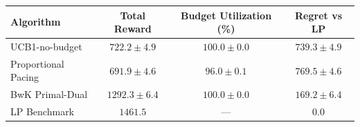 \begin{tabular}{lccc}
\hline
Algorithm & Total Reward & Budget Utilization (\%) & Regret vs LP \\
\hline
UCB1-no-budget & $722.2 \pm 4.9$ & $100.0 \pm 0.0$ & $739.3 \pm 4.9$ \\
Proportional Pacing & $691.9 \pm 4.6$ & $96.0 \pm 0.1$ & $769.5 \pm 4.6$ \\
BwK Primal-Dual & $1292.3 \pm 6.4$ & $100.0 \pm 0.0$ & $169.2 \pm 6.4$ \\
\hline
LP Benchmark & $1461.5$ & --- & $0.0$ \\
\hline
\end{tabular}
